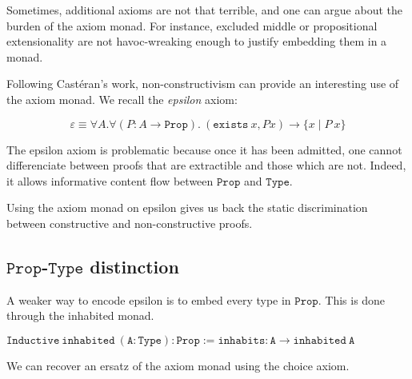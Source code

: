 \documentclass[a4paper,11pt]{article}
\theoremstyle{definition}
\theoremstyle{remark}
\begin{document}
Sometimes, additional axioms are not that terrible, and one can argue about the burden of the axiom monad. For instance, excluded middle or propositional extensionality are not havoc-wreaking enough to justify embedding them in a monad.

Following Castéran's work, non-constructivism can provide an interesting use of the axiom monad. We recall the \emph{epsilon} axiom:

$$\varepsilon \equiv \forall A.\forall (P : A\rightarrow  \mathtt{Prop}).\ (\mathtt{exists}\ x, P x) \rightarrow \{x\mid P\  x\}$$

The epsilon axiom is problematic because once it has been admitted, one cannot differenciate between proofs that are extractible and those which are not. Indeed, it allows informative content flow between $\mathtt{Prop}$ and $\mathtt{Type}$.

Using the axiom monad on epsilon gives us back the static discrimination between constructive and non-constructive proofs.

\subsection{$\mathtt{Prop}$-$\mathtt{Type}$ distinction}

A weaker way to encode epsilon is to embed every type in $\mathtt{Prop}$. This is done through the inhabited monad.

$\mathtt{Inductive\ inhabited\ (A : Type) : Prop :=  inhabits : A \rightarrow inhabited\ A}$

We can recover an ersatz of the axiom monad using the choice axiom.
\end{document}
